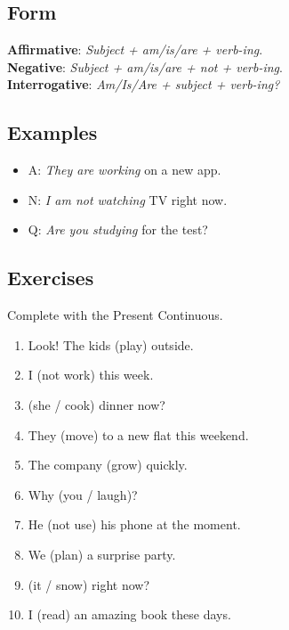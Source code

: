 \documentclass[11pt,a4paper]{article}
\begin{document}
\subsection*{Form}
\textbf{Affirmative}: \emph{Subject + am/is/are + verb-ing}.\\
\textbf{Negative}: \emph{Subject + am/is/are + not + verb-ing}.\\
\textbf{Interrogative}: \emph{Am/Is/Are + subject + verb-ing?}

\subsection*{Examples}
\begin{itemize}
  \item A: \emph{They are working} on a new app.
  \item N: \emph{I am not watching} TV right now.
  \item Q: \emph{Are you studying} for the test?
\end{itemize}

\subsection*{Exercises}
Complete with the Present Continuous.
\begin{enumerate}
  \item Look! The kids \underline{\hspace{2.5cm}} (play) outside.
  \item I \underline{\hspace{2.5cm}} (not work) this week.
  \item \underline{\hspace{2.5cm}} (she / cook) dinner now?
  \item They \underline{\hspace{2.5cm}} (move) to a new flat this weekend.
  \item The company \underline{\hspace{2.5cm}} (grow) quickly.
  \item Why \underline{\hspace{2.5cm}} (you / laugh)?
  \item He \underline{\hspace{2.5cm}} (not use) his phone at the moment.
  \item We \underline{\hspace{2.5cm}} (plan) a surprise party.
  \item \underline{\hspace{2.5cm}} (it / snow) right now?
  \item I \underline{\hspace{2.5cm}} (read) an amazing book these days.
\end{enumerate}
\end{document}
